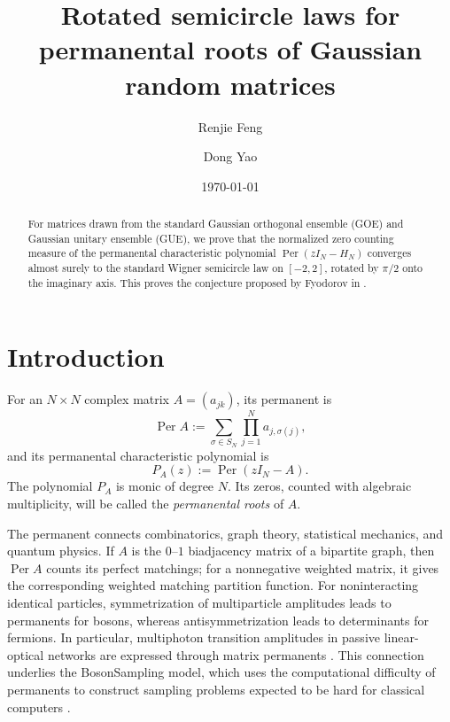 \documentclass[11pt,reqno]{amsart}
\title[Permanental roots of Gaussian random matrices]{Rotated semicircle laws for permanental roots of Gaussian random matrices}
\author{Renjie Feng}
\author{Dong Yao}
\date{\today}
\numberwithin{equation}{section}
\theoremstyle{definition}
\theoremstyle{remark}
\DeclareMathOperator{\Per}{Per}
\newcommand{\1}{\mathbf 1}
\begin{document}
\begin{abstract}
For matrices drawn from the standard Gaussian orthogonal ensemble (GOE) and
Gaussian unitary ensemble (GUE), we prove that the normalized zero counting
measure of the permanental characteristic polynomial
\(\Per(zI_N-H_N)\) converges almost surely to the standard Wigner semicircle
law on \([-2,2]\), rotated by \(\pi/2\) onto the imaginary axis.  This proves
the conjecture proposed by Fyodorov in \cite{Fyodorov2006}.
\end{abstract}

\maketitle

\section{Introduction}

For an \(N\times N\) complex matrix \(A=(a_{jk})\), its permanent is
\begin{equation}\label{eq:def-permanent}
  \Per A
  :=
  \sum_{\sigma\in S_N}\prod_{j=1}^N a_{j,\sigma(j)},
\end{equation}
and its permanental characteristic polynomial is
\[
  P_A(z):=\Per(zI_N-A).
\]
The polynomial \(P_A\) is monic of degree \(N\).  Its zeros, counted with
algebraic multiplicity, will be called the \emph{permanental roots} of \(A\).

The permanent connects combinatorics, graph theory, statistical mechanics,
and quantum physics.  If \(A\) is the \(0\)--\(1\) biadjacency matrix of a
bipartite graph, then \(\Per A\) counts its perfect matchings; for a
nonnegative weighted matrix, it gives the corresponding weighted matching
partition function.  For noninteracting identical particles, symmetrization
of multiparticle amplitudes leads to permanents for bosons, whereas
antisymmetrization leads to determinants for fermions.  In particular,
multiphoton transition amplitudes in passive linear-optical networks are
expressed through matrix permanents \cite{Scheel2004}.  This connection
underlies the BosonSampling model, which uses the computational difficulty of
permanents to construct sampling problems expected to be hard for classical
computers \cite{AaronsonArkhipov2013}.
\end{document}
